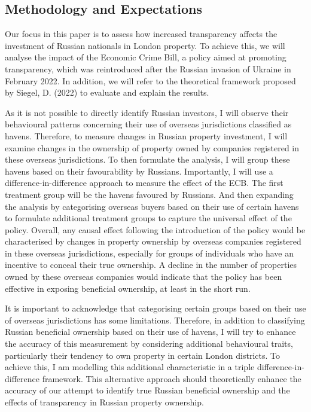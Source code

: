 \documentclass{article}
\begin{document}
\subsection{Methodology and Expectations}
Our focus in this paper is to assess how increased transparency affects the investment of Russian nationals in London property. To achieve this, we will analyse the impact of the Economic Crime Bill, a policy aimed at promoting transparency, which was reintroduced after the Russian invasion of Ukraine in February 2022. In addition, we will refer to the theoretical framework proposed by Siegel, D. (2022) to evaluate and explain the results.

As it is not possible to directly identify Russian investors, I will observe their behavioural patterns concerning their use of overseas jurisdictions classified as havens. Therefore, to measure changes in Russian property investment, I will examine changes in the ownership of property owned by companies registered in these overseas jurisdictions. To then formulate the analysis, I will group these havens based on their favourability by Russians. Importantly, I will use a difference-in-difference approach to measure the effect of the ECB. The first treatment group will be the havens favoured by Russians.  And then expanding the analysis by categorising overseas buyers based on their use of certain havens to formulate additional treatment groups to capture the universal effect of the policy. Overall, any causal effect following the introduction of the policy would be characterised by changes in property ownership by overseas companies registered in these overseas jurisdictions, especially for groups of individuals who have an incentive to conceal their true ownership. A decline in the number of properties owned by these overseas companies would indicate that the policy has been effective in exposing beneficial ownership, at least in the short run.

It is important to acknowledge that categorising certain groups based on their use of overseas jurisdictions has some limitations. Therefore, in addition to classifying Russian beneficial ownership based on their use of havens, I will try to enhance the accuracy of this measurement by considering additional behavioural traits, particularly their tendency to own property in certain London districts. To achieve this, I am modelling this additional characteristic in a triple difference-in-difference framework. This alternative approach should theoretically enhance the accuracy of our attempt to identify true Russian beneficial ownership and the effects of transparency in Russian property ownership.
\end{document}
